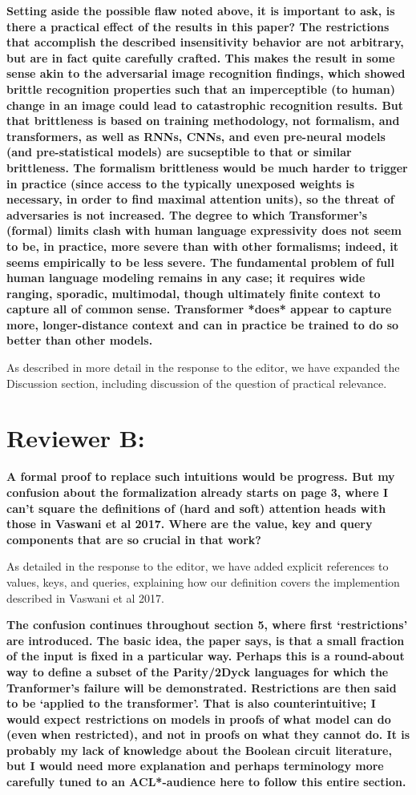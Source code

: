 \documentclass[11pt,a4paper]{article}
\newcommand\response[1]{{\color{blue}#1}}
\newcommand\original[1]{\textbf{#1}}
\begin{document}
\original{Setting aside the possible flaw noted above, it is important to ask, is
there a practical effect of the results in this paper? The
restrictions that accomplish the described insensitivity behavior are
not arbitrary, but are in fact quite carefully crafted. This makes the
result in some sense akin to the adversarial image recognition
findings, which showed brittle recognition properties such that an
imperceptible (to human) change in an image could lead to
catastrophic recognition results. But that brittleness is based on
training methodology, not formalism, and transformers, as well as
RNNs, CNNs, and even pre-neural models (and pre-statistical models)
are sucseptible to that or similar brittleness. The formalism
brittleness would be much harder to trigger in practice (since access
to the typically unexposed weights is necessary, in order to find
maximal attention units), so the threat
of adversaries is not increased. The degree to which Transformer's
(formal) limits clash with human language expressivity does not seem
to be, in practice, more severe than with other formalisms; indeed, it
seems empirically to be less severe. The fundamental problem of full
human language modeling remains in any case; it requires wide ranging,
sporadic, multimodal, though ultimately finite context to capture all
of common sense. Transformer *does* appear to capture more,
longer-distance context and can in practice be trained to do so better
than other models.}

\response{As described in more detail in the response to the editor, we have expanded the Discussion section, including discussion of the question of practical relevance.}

\section{Reviewer B:}


\original{A formal proof to replace such intuitions would be progress. But my
confusion about the formalization already starts on page 3, where I can’t
square the definitions of (hard and soft) attention heads with those in
Vaswani et al 2017. Where are the value, key and query components that are
so crucial in that work?}

\response{As detailed in the response to the editor, we have added explicit references to values, keys, and queries, explaining how our definition covers the implemention described in Vaswani et al 2017.}

\original{The confusion continues throughout section 5, where first ‘restrictions’
are introduced. The basic idea, the paper says, is that a small fraction of
the input is fixed in a particular way. Perhaps this is a round-about way to
define a subset of the Parity/2Dyck languages for which the Tranformer’s
failure will be demonstrated. Restrictions are then said to be ‘applied to
the transformer’. That is also counterintuitive; I would expect
restrictions on models in proofs of what model can do (even when
restricted), and not in proofs on what they cannot do. It is probably my
lack of knowledge about the Boolean circuit literature, but I would need
more explanation and perhaps terminology more carefully tuned to an
ACL*-audience here to follow this entire section.}
\end{document}
